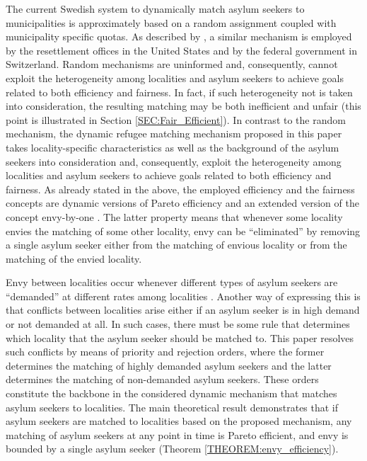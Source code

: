 \documentclass[12pt,fleqn]{article}
\begin{document}
The current Swedish system to dynamically match asylum seekers to municipalities is approximately based on a random assignment coupled with municipality specific quotas. As described by \citet[][p.325]{bib:BansakEtAl}, a similar mechanism is employed by the resettlement offices in the United States and by the federal government in Switzerland. Random mechanisms are uninformed and, consequently, cannot exploit the heterogeneity among localities and asylum seekers to achieve goals related to both efficiency and fairness. In fact, if such heterogeneity not is taken into consideration, the resulting matching may be both inefficient and unfair (this point is illustrated in Section \ref{SEC:Fair_Efficient}). In contrast to the random mechanism, the dynamic refugee matching mechanism proposed in this paper takes locality-specific characteristics as well as the background of the asylum seekers into consideration and, consequently, exploit the heterogeneity among localities and asylum seekers to achieve goals related to both efficiency and fairness. As already stated in the above, the employed efficiency and the fairness concepts are dynamic versions of Pareto efficiency and an extended version of the concept envy-by-one \citep{bib:Budish}. The latter property means that whenever some locality envies the matching of some other locality, envy can be ``eliminated'' by removing a single asylum seeker either from the matching of envious locality or from the matching of the envied locality.

Envy between localities occur whenever different types of asylum seekers are ``demanded'' at different rates among localities \citep{bib:BansakEtAl}. Another way of expressing this is that conflicts between localities arise either if an asylum seeker is in high demand or not demanded at all. In such cases, there must be some rule that determines which locality that the asylum seeker should be matched to. This paper resolves such conflicts by means of priority and rejection orders, where the former determines the matching of highly demanded asylum seekers and the latter determines the matching of non-demanded asylum seekers. These orders constitute the backbone in the considered dynamic mechanism that matches asylum seekers to localities. The main theoretical result demonstrates that if asylum seekers are matched to localities based on the proposed mechanism, any matching of asylum seekers at any point in time is Pareto efficient, and envy is bounded by a single asylum seeker (Theorem \ref{THEOREM:envy_efficiency}).
\end{document}
